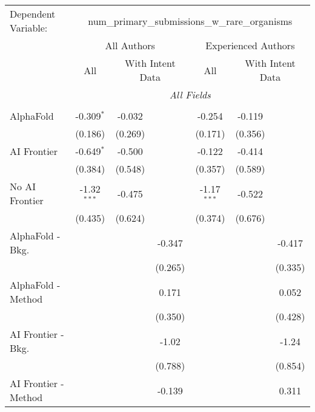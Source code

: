 \begingroup
\centering
\begin{tabular}{lcccccc}
   \tabularnewline \midrule \midrule
   Dependent Variable: & \multicolumn{6}{c}{num\_primary\_submissions\_w\_rare\_organisms}\\
 & \multicolumn{3}{c}{All Authors} & \multicolumn{3}{c}{Experienced Authors} \\
\cmidrule(lr){2-4} \cmidrule(lr){5-7}
 & \multicolumn{1}{c}{All} & \multicolumn{2}{c}{With Intent Data} & \multicolumn{1}{c}{All} & \multicolumn{2}{c}{With Intent Data} \\
\cmidrule(lr){2-2} \cmidrule(lr){3-4} \cmidrule(lr){5-5} \cmidrule(lr){6-7}
 & \multicolumn{6}{c}{\textit{All Fields}} \\ \\
   AlphaFold               & -0.309$^{*}$  & -0.032  &               & -0.254        & -0.119  &   \\   
                           & (0.186)       & (0.269) &               & (0.171)       & (0.356) &   \\   
   AI Frontier             & -0.649$^{*}$  & -0.500  &               & -0.122        & -0.414  &   \\   
                           & (0.384)       & (0.548) &               & (0.357)       & (0.589) &   \\   
   No AI Frontier          & -1.32$^{***}$ & -0.475  &               & -1.17$^{***}$ & -0.522  &   \\   
                           & (0.435)       & (0.624) &               & (0.374)       & (0.676) &   \\   
   AlphaFold - Bkg.        &               &         & -0.347        &               &         & -0.417\\   
                           &               &         & (0.265)       &               &         & (0.335)\\   
   AlphaFold - Method      &               &         & 0.171         &               &         & 0.052\\   
                           &               &         & (0.350)       &               &         & (0.428)\\   
   AI Frontier - Bkg.      &               &         & -1.02         &               &         & -1.24\\   
                           &               &         & (0.788)       &               &         & (0.854)\\   
   AI Frontier - Method    &               &         & -0.139        &               &         & 0.311\\   

\end{tabular}
